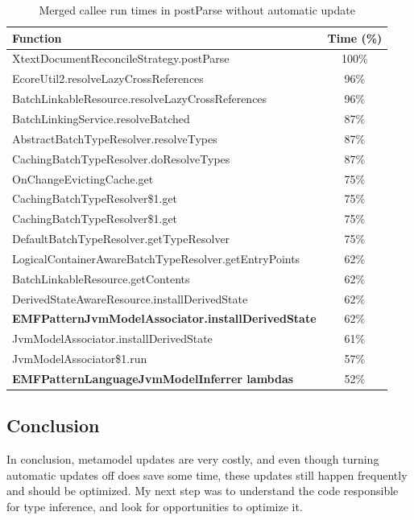 \documentclass[11pt,a4paper,oneside]{report}
\begin{document}
\begin{table}[ht]
    \footnotesize
    \centering
    \begin{tabular}{ l c }
        \toprule
        Function & Time (\%) \\
        \midrule
        XtextDocumentReconcileStrategy.postParse & 100\% \\
        EcoreUtil2.resolveLazyCrossReferences & 96\% \\
        BatchLinkableResource.resolveLazyCrossReferences & 96\% \\
        BatchLinkingService.resolveBatched & 87\% \\
        AbstractBatchTypeResolver.resolveTypes & 87\% \\
        CachingBatchTypeResolver.doResolveTypes & 87\% \\
        OnChangeEvictingCache.get & 75\% \\
        CachingBatchTypeResolver\$1.get & 75\% \\
        CachingBatchTypeResolver\$1.get & 75\% \\
        DefaultBatchTypeResolver.getTypeResolver & 75\% \\
        LogicalContainerAwareBatchTypeResolver.getEntryPoints & 62\% \\
        BatchLinkableResource.getContents & 62\% \\
        DerivedStateAwareResource.installDerivedState & 62\% \\
        \textbf{EMFPatternJvmModelAssociator.installDerivedState} & 62\% \\
        JvmModelAssociator.installDerivedState & 61\% \\
        JvmModelAssociator\$1.run & 57\% \\
        \textbf{EMFPatternLanguageJvmModelInferrer lambdas} & 52\% \\
        \bottomrule
    \end{tabular}
    \caption{Merged callee run times in postParse without automatic update}
    \label{tab:postparse-no-auto-update}
\end{table}

\subsection{Conclusion}
In conclusion, metamodel updates are very costly, and even though turning
automatic updates off does save some time, these updates still happen
frequently and should be optimized. My next step was to understand the code
responsible for type inference, and look for opportunities to optimize it.
\end{document}
